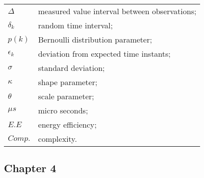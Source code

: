 \begin{longtable}{ll}
	$\Delta$				& measured value interval between observations; \\
	$\delta_k$				& random time interval; \\
	
	$p(k)$					& Bernoulli distribution parameter; \\
	$\epsilon_k$			& deviation from expected time instants; \\
	$\sigma$				& standard deviation; \\
	$\kappa$				& shape parameter; \\
	$\theta$				& scale parameter; \\
	
	$\mu s$					& micro seconds; \\
	$E.E$					& energy efficiency; \\
	$Comp.$					& complexity. \\

\end{longtable}


\subsection*{Chapter 4}


